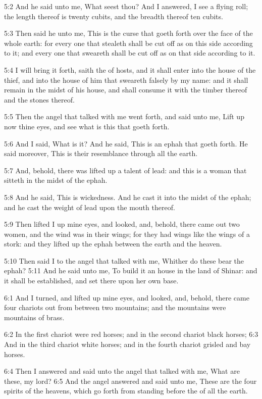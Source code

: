 5:2 And he said unto me, What seest thou? And I answered, I see a flying roll; the length thereof is twenty cubits, and the breadth thereof ten cubits.

5:3 Then said he unto me, This is the curse that goeth forth over the face of the whole earth: for every one that stealeth shall be cut off as on this side according to it; and every one that sweareth shall be cut off as on that side according to it.

5:4 I will bring it forth, saith the \LORD of hosts, and it shall enter into the house of the thief, and into the house of him that sweareth falsely by my name: and it shall remain in the midst of his house, and shall consume it with the timber thereof and the stones thereof.

5:5 Then the angel that talked with me went forth, and said unto me, Lift up now thine eyes, and see what is this that goeth forth.

5:6 And I said, What is it? And he said, This is an ephah that goeth forth. He said moreover, This is their resemblance through all the earth.

5:7 And, behold, there was lifted up a talent of lead: and this is a woman that sitteth in the midst of the ephah.

5:8 And he said, This is wickedness. And he cast it into the midst of the ephah; and he cast the weight of lead upon the mouth thereof.

5:9 Then lifted I up mine eyes, and looked, and, behold, there came out two women, and the wind was in their wings; for they had wings like the wings of a stork: and they lifted up the ephah between the earth and the heaven.

5:10 Then said I to the angel that talked with me, Whither do these bear the ephah?  5:11 And he said unto me, To build it an house in the land of Shinar: and it shall be established, and set there upon her own base.

6:1 And I turned, and lifted up mine eyes, and looked, and, behold, there came four chariots out from between two mountains; and the mountains were mountains of brass.

6:2 In the first chariot were red horses; and in the second chariot black horses; 6:3 And in the third chariot white horses; and in the fourth chariot grisled and bay horses.

6:4 Then I answered and said unto the angel that talked with me, What are these, my lord?  6:5 And the angel answered and said unto me, These are the four spirits of the heavens, which go forth from standing before the \LORD of all the earth.

